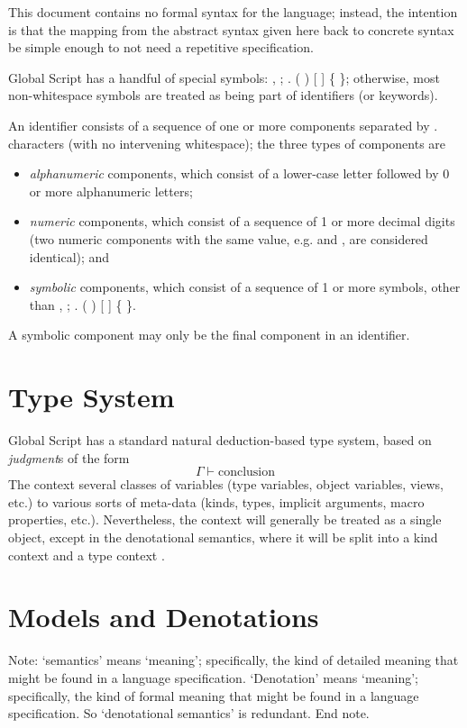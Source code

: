 \documentclass{report}
\newcommand\sequent\vdash
\newcommand\defn[1]{\emph{#1}}
\begin{document}
This document contains no formal syntax for the language;
instead, the intention is that the mapping from the abstract syntax given here back to concrete syntax be simple enough to not need a repetitive specification.

Global Script has a handful of special symbols: \<, ; . ( ) [ ] \{ \}\>;
otherwise, most non-whitespace symbols are treated as being part of identifiers (or keywords).

An identifier consists of a sequence of one or more components separated by \<.\> characters (with no intervening whitespace);
the three types of components are
\begin{itemize}
  \item \defn{alphanumeric} components, which consist of a lower-case letter followed by 0 or more alphanumeric letters;
  \item \defn{numeric} components, which consist of a sequence of 1 or more decimal digits (two numeric components with the same value, e.g. \> and \>, are considered identical); and
  \item \defn{symbolic} components, which consist of a sequence of 1 or more symbols, other than \<, ; . ( ) [ ] \{ \}\>.
\end{itemize}
A symbolic component may only be the final component in an identifier.

\section{Type System}

Global Script has a standard natural deduction-based type system, based on \defn{judgment}s of the form
\begin{displaymath}
    \Gamma \sequent \text{conclusion}
\end{displaymath}
The context \<\Gamma\> several classes of variables (type variables, object variables, views, etc.) to various sorts of meta-data (kinds, types, implicit arguments, macro properties, etc.).
Nevertheless, the context will generally be treated as a single object, except in the denotational semantics,
where it will be split into a kind context \<\Delta\> and a type context \<\Gamma\>.

\section{Models and Denotations}

Note: `semantics' means `meaning'; specifically, the kind of detailed meaning that might be found in a language specification.
`Denotation' means `meaning'; specifically, the kind of formal meaning that might be found in a language specification.
So `denotational semantics' is redundant.
End note.
\end{document}
